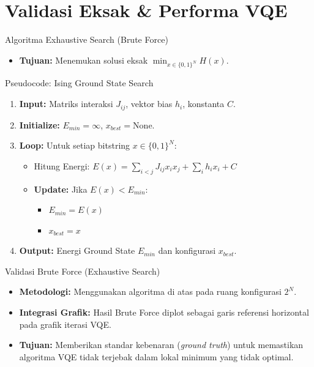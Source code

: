 \section{Validasi Eksak \& Performa VQE}

\begin{frame}[fragile]{Algoritma Exhaustive Search (Brute Force)}
    \begin{itemize}
        \item \textbf{Tujuan:} Menemukan solusi eksak $\min_{x \in \{0,1\}^N} H(x)$.
    \end{itemize}
    \begin{block}{Pseudocode: Ising Ground State Search}
    \begin{enumerate}
        \item \textbf{Input:} Matriks interaksi $J_{ij}$, vektor bias $h_i$, konstanta $C$.
        \item \textbf{Initialize:} $E_{min} = \infty$, $x_{best} = \text{None}$.
        \item \textbf{Loop:} Untuk setiap bitstring $x \in \{0, 1\}^N$:
        \begin{itemize}
            \item Hitung Energi: $E(x) = \sum_{i<j} J_{ij} x_i x_j + \sum_{i} h_i x_i + C$
            \item \textbf{Update:} Jika $E(x) < E_{min}$:
            \begin{itemize}
                \item $E_{min} = E(x)$
                \item $x_{best} = x$
            \end{itemize}
        \end{itemize}
        \item \textbf{Output:} Energi Ground State $E_{min}$ dan konfigurasi $x_{best}$.
    \end{enumerate}
    \end{block}
\end{frame}

\begin{frame}{Validasi Brute Force (Exhaustive Search)}
    \begin{itemize}
        \item \textbf{Metodologi:} Menggunakan algoritma di atas pada ruang konfigurasi $2^N$.
        \item \textbf{Integrasi Grafik:} Hasil Brute Force diplot sebagai garis referensi horizontal pada grafik iterasi VQE.
        \item \textbf{Tujuan:} Memberikan standar kebenaran (\textit{ground truth}) untuk memastikan algoritma VQE tidak terjebak dalam lokal minimum yang tidak optimal.
    \end{itemize}
\end{frame}

